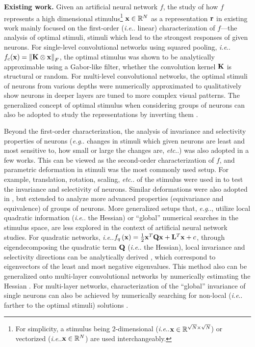 \documentclass[fleqn]{article} %
\makeatletter
\DeclareRobustCommand\onedot{\futurelet\@let@token\@onedot}
\def\@onedot{\ifx\@let@token.\else.\null\fi\xspace}
\def\eg{\emph{e.g}\onedot} \def\Eg{\emph{E.g}\onedot}
\def\ie{\emph{i.e}\onedot} \def\Ie{\emph{I.e}\onedot}
\def\etc{\emph{etc}\onedot} \def\vs{\emph{vs}\onedot}
\makeatother
\begin{document}
\newcommand{\expstimdim}{For simplicity, a stimulus being 2-dimensional (\ie ${\bf{x}} \in \mathbb{R}^{\sqrt{N} \times \sqrt{N}}$) or vectorized (\ie ${\bf{x}} \in \mathbb{R}^N$) are used interchangeably.}

{\bf Existing work.} 
Given an artificial neural network $f$, the study of how $f$ represents a high dimensional stimulus\footnote{\expstimdim} ${\bf{x}} \in \mathbb{R}^N$ as a representation 
${\bf{r}}$ in existing work mainly focused on the first-order (\ie linear) characterization of $f$---the analysis of optimal stimuli, stimuli which lead to the strongest responses of given neurons.
For single-level convolutional networks using squared pooling, \ie $f_c({\bf{x}}) = \left\| {\bf{K}} \otimes {\bf{x}} \right\|_{F}$, the optimal stimulus was shown to be analytically approximable \cite{saxe2011random} using a Gabor-like filter, whether the convolution kernel $\bf{K}$ is structural or random.
For multi-level convolutional networks, the optimal stimuli of neurons from various depths were numerically approximated \cite{erhan2010understanding, ngiam2010tiled, le2012building, zeiler2014visualizing, simonyan2013deep} to qualitatively show neurons in deeper layers are tuned to more complex visual patterns.
The generalized concept of optimal stimulus when considering groups of neurons can also be adopted to study the representations by inverting them \cite{mahendran2014understanding}.

Beyond the first-order characterization, the analysis of invariance and selectivity properties of neurons (\eg changes in stimuli which given neurons are least and most sensitive to, how small or large the changes are, \etc) was also adopted in a few works.
This can be viewed as the second-order characterization of $f$, and parametric deformation in stimuli was the most commonly used setup.
For example, translation, rotation, scaling, \etc of the stimulus were used in \cite{goodfellow2009measuring, zeiler2014visualizing} to test the invariance and selectivity of neurons.
Similar deformations were also adopted in \cite{lenc2014understanding}, but extended to analyze more advanced properties (equivariance and equivalence) of groups of neurons.
More generalized setups that, \eg, utilize local quadratic information (\ie the Hessian) or ``global'' numerical searches in the stimulus space, are less explored in the context of artificial neural network studies. %
For quadratic networks, \ie $f_q\left({\bf{x}}\right) = \frac{1}{2}{\bf{x}}^{T}{\bf{Qx}}+{\bf{L}}^{T}{\bf{x}}+c$, through eigendecomposing the quadratic term $\bf{Q}$ (\ie the Hessian), local invariance and selectivity directions can be analytically derived \cite{berkes2006analysis}, which correspond to eigenvectors of the least and most negative eigenvalues.
This method also can be generalized onto multi-layer convolutional networks by numerically estimating the Hessian \cite{ngiam2010tiled}.
For multi-layer networks, characterization of the ``global'' invariance of single neurons can also be achieved by numerically searching for non-local (\ie farther to the optimal stimuli) solutions \cite{erhan2010understanding}.
\end{document}
